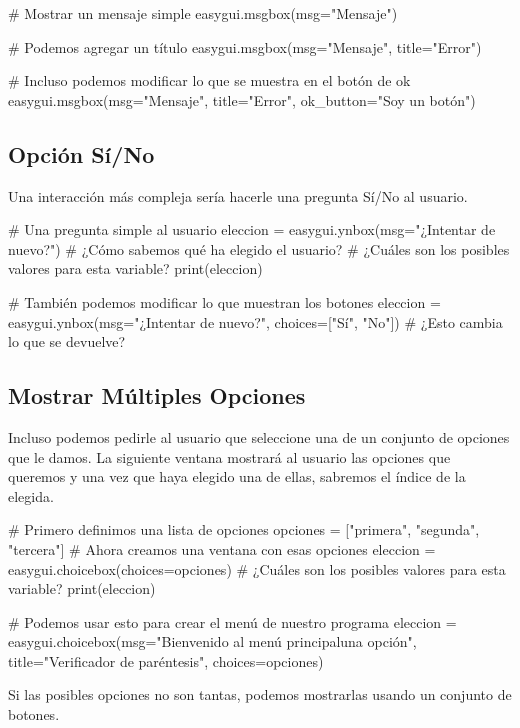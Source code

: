 \documentclass[10pt,a4paper]{article}
\begin{document}
\begin{attachedlisting}[message]
# Mostrar un mensaje simple
easygui.msgbox(msg="Mensaje")

# Podemos agregar un título
easygui.msgbox(msg="Mensaje", title="Error")

# Incluso podemos modificar lo que se muestra en el botón de ok
easygui.msgbox(msg="Mensaje", title="Error", ok_button="Soy un botón")
\end{attachedlisting}

\subsection{Opción Sí/No}
Una interacción más compleja sería hacerle una pregunta Sí/No al usuario.

\begin{attachedlisting}[yesno]
# Una pregunta simple al usuario
eleccion = easygui.ynbox(msg="¿Intentar de nuevo?")
# ¿Cómo sabemos qué ha elegido el usuario?
# ¿Cuáles son los posibles valores para esta variable?
print(eleccion)

# También podemos modificar lo que muestran los botones
eleccion = easygui.ynbox(msg="¿Intentar de nuevo?", choices=["Sí", "No"])
# ¿Esto cambia lo que se devuelve?
\end{attachedlisting}

\subsection{Mostrar Múltiples Opciones}
Incluso podemos pedirle al usuario que seleccione una de un conjunto de opciones que le damos. La siguiente ventana mostrará al usuario las opciones que queremos y una vez que haya elegido una de ellas, sabremos el índice de la elegida.

\begin{attachedlisting}[choices]
# Primero definimos una lista de opciones
opciones = ["primera", "segunda", "tercera"]
# Ahora creamos una ventana con esas opciones
eleccion = easygui.choicebox(choices=opciones)
# ¿Cuáles son los posibles valores para esta variable?
print(eleccion)

# Podemos usar esto para crear el menú de nuestro programa
eleccion = easygui.choicebox(msg="Bienvenido al menú principal\nSelecciona una opción", title="Verificador de paréntesis", choices=opciones)
\end{attachedlisting}

Si las posibles opciones no son tantas, podemos mostrarlas usando un conjunto de botones.
\end{document}
